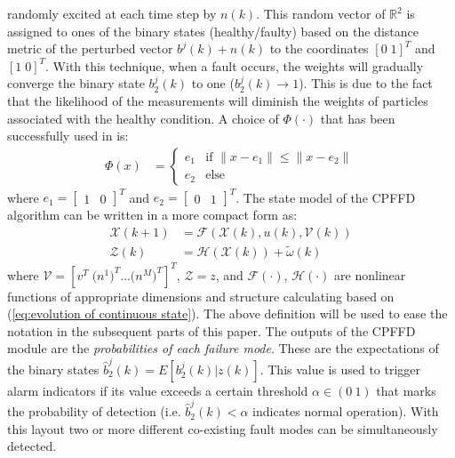 \documentclass[10pt,twocolumn,twoside]{IEEEtran}
\begin{document}
randomly excited at each time step by $n\left(k\right)$. This random
vector of $\mathbb{R}^{2}$ is assigned to ones of the binary states
(healthy/faulty) based on the distance metric of the perturbed vector
$b^{j}\left(k\right)+n\left(k\right)$ to the coordinates $[0\;1]^{T}$
and $[1\;0]^{T}$. With this technique, when a fault occurs, the weights
will gradually converge the binary state $b_{2}^{j}\left(k\right)$
to one ($b_{2}^{j}\left(k\right)\rightarrow1$). This is due to the
fact that the likelihood of the measurements will diminish the weights
of particles associated with the healthy condition. A choice of $\Phi\left(\cdot\right)$
that has been successfully used in \cite{orchard2007particle,Orchard2009,raptis2011adaptive,raptisparticle}
is: 
\begin{equation}
\begin{aligned}\Phi(x) & =\begin{cases}
e_{1} & \text{if }\parallel x-e_{1}\parallel\le\parallel x-e_{2}\parallel\\
e_{2} & \text{else}
\end{cases}\end{aligned}
\label{eq:function of Boolean states}
\end{equation}
\noindent where $e_{1}=\left[\begin{array}{cc}
1 & 0\end{array}\right]^{T}$ and $e_{2}=\left[\begin{array}{cc}
0 & 1\end{array}\right]^{T}$. The state model of the CPFFD algorithm can be written in a more
compact form as:
\begin{align}
\mathcal{X}\left(k+1\right) & =\mathcal{F}\left(\mathcal{X}\left(k\right),u\left(k\right),\mathcal{V}\left(k\right)\right)\label{eq:compact-form}\\
\mathcal{Z}\left(k\right) & =\mathcal{H}\left(\mathcal{X}\left(k\right)\right)+\tilde{\omega}\left(k\right)\nonumber 
\end{align}
\noindent where $\mathcal{V}=\left[v^{T}\;\big(n^{1}\big)^{T}\ldots\big(n^{M}\big)^{T}\right]^{T}$,
$\mathcal{Z}=z$, and $\mathcal{F}(\cdot)$, $\mathcal{H}(\cdot)$
are nonlinear functions of appropriate dimensions and structure calculating
based on (\ref{eq:evolution of continuous state}). The above definition
will be used to ease the notation in the subsequent parts of this
paper. The outputs of the CPFFD module are the \emph{probabilities
of each failure mode}. These are the expectations of the binary states
$\hat{b}_{2}^{j}\left(k\right)=E\left[b_{2}^{j}\left(k\right)|z\left(k\right)\right]$.
This value is used to trigger alarm indicators if its value exceeds
a certain threshold $\alpha\in\left(0\:1\right)$ that marks the probability
of detection (i.e. $\hat{b}_{2}^{j}\left(k\right)<\alpha$ indicates
normal operation). With this layout two or more different co-existing
fault modes can be simultaneously detected. 
\end{document}

